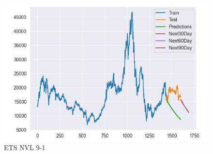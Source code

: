 \documentclass[conference]{IEEEtran}
\begin{document}
\begin{figure}[htbp]
\begin{minipage}{0.23\textwidth}
    \includegraphics[width=1\textwidth]{experiment/ets/TEAM4_ETS_DXG_9_1.png}
    \caption{ETS NVL 9-1}
    \label{fig:nvl_histogram}
    \end{minipage}
\end{figure}
\newpage
\end{document}
